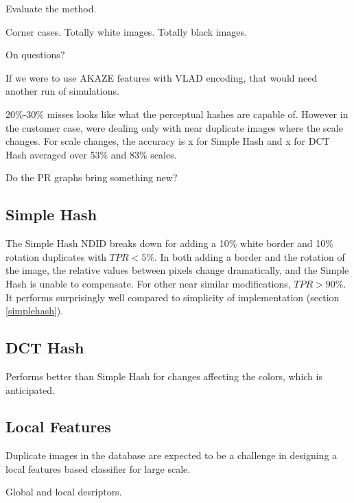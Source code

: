 \documentclass[english,12pt,a4paper,pdftex,elec,utf8]{aaltothesis}
\begin{document}
Evaluate the method.


Corner cases.
Totally white images. Totally black images.

On questions?

If we were to use AKAZE features with VLAD encoding, that would need another run of simulations.

20\%-30\% misses looks like what the perceptual hashes are capable of. However in the customer case, were dealing only with near duplicate images where the scale changes. For scale changes, the accuracy is x for Simple Hash and x for DCT Hash averaged over 53\% and 83\% scales.

Do the PR graphs bring something new?

\subsection{Simple Hash}
The Simple Hash NDID breaks down for adding a 10\% white border and 10\% rotation duplicates with $TPR < 5\%$. In both adding a border and the rotation of the image, the relative values between pixels change dramatically, and the Simple Hash is unable to compensate. For other near similar modifications, $TPR > 90\%$. It performs surprisingly well compared to simplicity of implementation (section \ref{simplehash}).


\subsection{DCT Hash}
Performs better than Simple Hash for changes affecting the colors, which is anticipated.

\subsection{Local Features}

Duplicate images in the database are expected to be a challenge in designing a local features based classifier for large scale.

Global and local desriptors.

\clearpage


{}

{}
\end{document}
